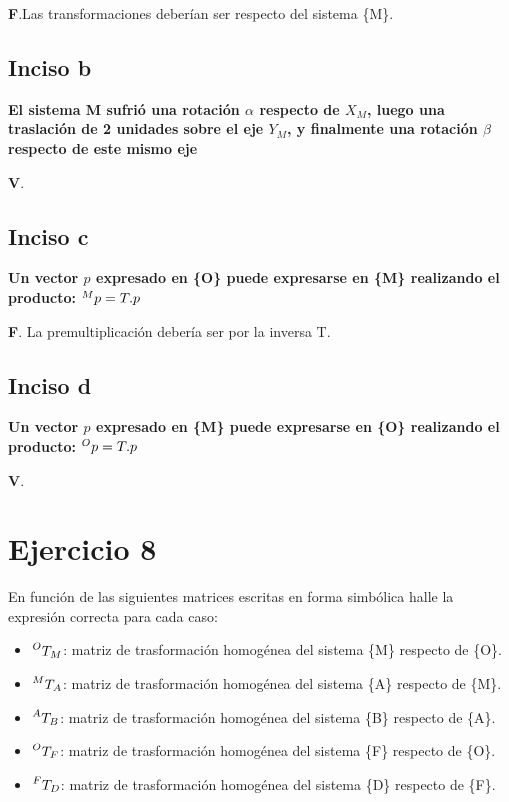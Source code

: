 \documentclass[a4paper,12pt]{article}
\begin{document}
\textbf{F}.Las transformaciones deberían ser respecto del sistema \{M\}.

\subsection{Inciso b}
\textbf{El sistema {M} sufrió una rotación $\alpha$ respecto de $X_M$, luego una traslación de 2
unidades sobre el eje $Y_M$, y finalmente una rotación $\beta$ respecto de este mismo eje}
\vspace*{0.5 cm}

\textbf{V}.

\subsection{Inciso c}
\textbf{Un vector $p$ expresado en \{O\} puede expresarse en \{M\} realizando el producto: $\prescript{M}{}{p} =
T. p$}
\vspace*{0.5 cm}

\textbf{F}. La premultiplicación debería ser por la inversa T.

\subsection{Inciso d}
\textbf{Un vector $p$ expresado en \{M\} puede expresarse en \{O\} realizando el producto: $\prescript{O}{}{p} =
T. p$}
\vspace*{0.5 cm}

\textbf{V}.

\section{Ejercicio 8}
En función de las siguientes matrices escritas en forma simbólica halle la expresión
correcta para cada caso:

\begin{itemize}
    \item $\prescript{O}{}{T_M}$: matriz de trasformación homogénea del sistema \{M\} respecto de \{O\}.
    \item $\prescript{M}{}{T_A}$: matriz de trasformación homogénea del sistema \{A\} respecto de \{M\}.
    \item $\prescript{A}{}{T_B}$: matriz de trasformación homogénea del sistema \{B\} respecto de \{A\}.
    \item $\prescript{O}{}{T_F}$: matriz de trasformación homogénea del sistema \{F\} respecto de \{O\}.
    \item $\prescript{F}{}{T_D}$: matriz de trasformación homogénea del sistema \{D\} respecto de \{F\}.
\end{itemize}
\end{document}
